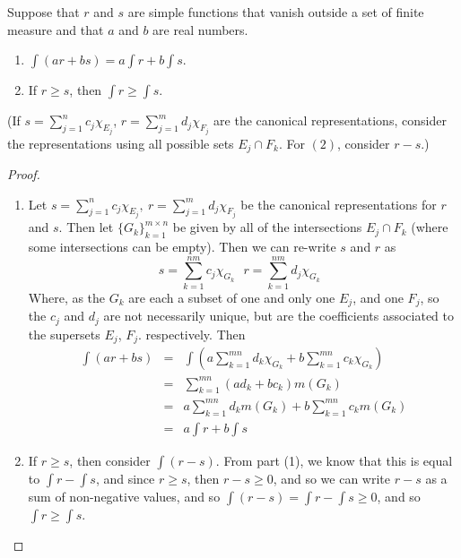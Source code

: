 \begin{pblm}\label{p:simplefuncintislinear}%
	Suppose that $r$ and $s$ are simple functions that vanish outside a set of 
	finite measure and that $a$ and $b$ are real numbers. 
	\begin{enumerate}
		\item $\int (ar + bs) = a\int r + b \int s.$
		\item If $r \ge s$, then $\int r \ge \int s.$ 
	\end{enumerate}
	{\scriptsize{(If $s = \sum\limits_{j=1}^n c_j\chi_{E_j}$, $r = \sum\limits_{j=1}^m d_j\chi_{F_j}$ are 
	the canonical representations, consider the representations using all possible sets 
	$E_j \cap F_k$. For $(2)$, consider $r - s$.)}}
\begin{proof}~
	\begin{enumerate}
	\item Let $s = \sum\limits_{j=1}^nc_j\chi_{E_j},~ r = \sum\limits_{j=1}^md_j\chi_{F_j}$ be the canonical 
	representations for $r$ and $s$. Then let $\{G_k\}_{k=1}^{m\times n}$ be given by all of the 
	intersections  $E_j \cap F_k$ (where some intersections can be empty). 
	Then we can re-write $s$ and $r$ as 
	\begin{equation*}
		s = \sum\limits_{k=1}^{nm}c_j\chi_{G_k}~~~ 
		r = \sum\limits_{k=1}^{nm}d_j\chi_{G_k}~~~ 
	\end{equation*}
	Where, as the $G_k$ are each a subset of one and only one $E_j$, and one $F_j$, so the $c_j$ and $d_j$ 
	are not necessarily unique, but are the coefficients associated to the supersets $E_j$, $F_j$. 
	respectively. Then 
	\begin{equation*}
	\begin{array}{rcl}
		\int(ar + bs) &=& \int \left(a\sum\limits_{k=1}^{mn} d_k\chi_{G_k} + 
					   b\sum\limits_{k=1}^{mn} c_k\chi_{G_k}\right)\\
			&=& \sum\limits_{k=1}^{mn} (ad_k + bc_k) m(G_k)\\
			&=& a\sum\limits_{k=1}^{mn} d_k m(G_k) + b\sum\limits_{k=1}^{mn} c_k m(G_k)\\
			&=& a\int r + b \int s
	\end{array}
	\end{equation*}
	\item If $r \ge s$, then consider $\int (r - s)$. From part (1), we know that this 
	is equal to $\int r - \int s$, and since $r \ge s$, then $r - s \ge 0$, and so 
	we can write $r - s$ as a sum of non-negative values, and so 
	$\int (r - s) = \int r  - \int s \ge 0$, and so $\int r \ge \int s$. 
	\end{enumerate}
\end{proof}
\end{pblm}


